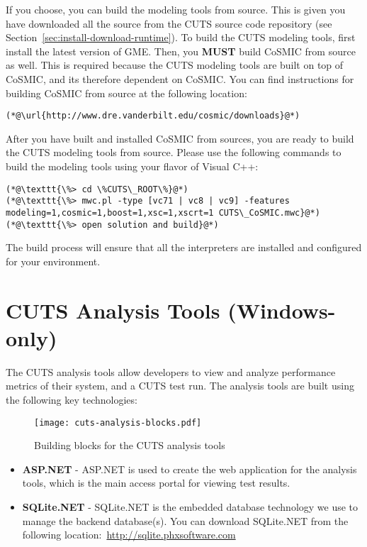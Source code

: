 If you choose, you can build the modeling tools from source. This is given you
have downloaded all the source from the CUTS source code repository (see 
Section~\ref{sec:install-download-runtime}). To build the CUTS modeling tools,
first install the latest version of GME. Then, you \textbf{MUST} build CoSMIC
from source as well. This is required because the CUTS modeling tools are
built on top of CoSMIC, and its therefore dependent on CoSMIC. You can find
instructions for building CoSMIC from source at the following location:
\begin{lstlisting}
(*@\url{http://www.dre.vanderbilt.edu/cosmic/downloads}@*)
\end{lstlisting}
After you have built and installed CoSMIC from sources, you are ready to build
the CUTS modeling tools from source. Please use the following commands to 
build the modeling tools using your flavor of Visual C++:
\begin{lstlisting}
(*@\texttt{\%> cd \%CUTS\_ROOT\%}@*)
(*@\texttt{\%> mwc.pl -type [vc71 | vc8 | vc9] -features modeling=1,cosmic=1,boost=1,xsc=1,xscrt=1 CUTS\_CoSMIC.mwc}@*)
(*@\texttt{\%> open solution and build}@*)
\end{lstlisting}
The build process will ensure that all the interpreters are installed
and configured for your environment.

\section{CUTS Analysis Tools (Windows-only)}

The CUTS analysis tools allow developers to view and analyze performance metrics
of their system, and a CUTS test run. The analysis tools are built using the 
following key technologies:
\begin{figure}[htbp]
  \centering
  \texttt{[image: cuts-analysis-blocks.pdf]}
  \caption{Building blocks for the CUTS analysis tools}
  \label{fig:cuts-analysis-blocks}
\end{figure}
\begin{itemize}
  \item \textbf{ASP.NET} - ASP.NET is used to create the web application
  for the analysis tools, which is the main access portal for viewing 
  test results.

  \item \textbf{SQLite.NET} - SQLite.NET is the embedded database technology
  we use to manage the backend database(s). You can download SQLite.NET
  from the following location:~\url{http://sqlite.phxsoftware.com}
\end{itemize}

